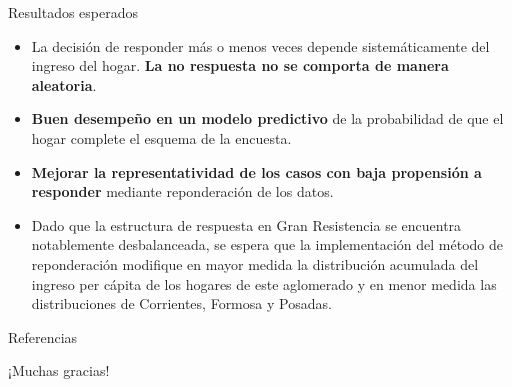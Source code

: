\documentclass[10pt]{beamer}
\begin{document}
\begin{frame}{Resultados esperados}
\begin{itemize}
    \item La decisión de responder más o menos veces depende sistemáticamente del ingreso del hogar. \textbf{La no respuesta no se comporta de manera aleatoria}.
    \item \textbf{Buen desempeño en un modelo predictivo} de la probabilidad de que el hogar complete el esquema de la encuesta. 
    \item \textbf{Mejorar la representatividad de los casos con baja propensión a responder} mediante reponderación de los datos.
    \item Dado que la estructura de respuesta en Gran Resistencia se encuentra notablemente desbalanceada, se espera que la implementación del método de reponderación modifique en mayor medida la distribución acumulada del ingreso per cápita de los hogares de este aglomerado y en menor medida las distribuciones de Corrientes, Formosa y Posadas.
\end{itemize}
\end{frame}

\appendix

\begin{frame}[allowframebreaks]{Referencias}
  \printbibliography[heading=none]
\end{frame}

\begin{frame}[standout]
  ¡Muchas gracias!
\end{frame}
\end{document}
